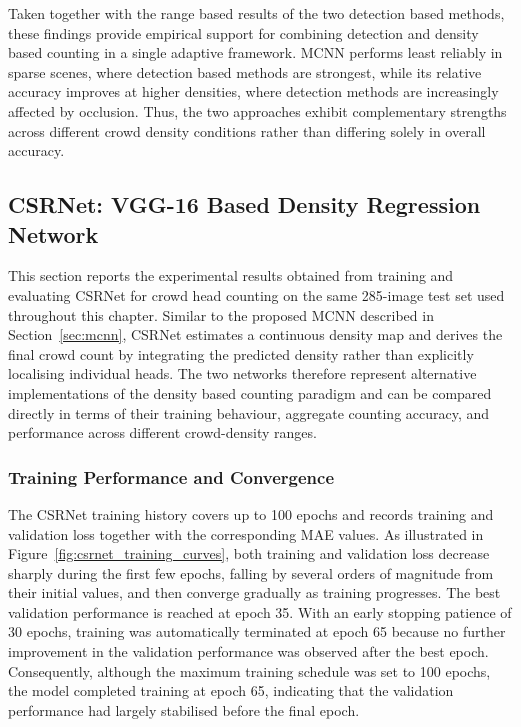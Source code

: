 Taken together with the range based results of the two detection based methods, these findings provide empirical support for combining detection and density based counting in a single adaptive framework. MCNN performs least reliably in sparse scenes, where detection based methods are strongest, while its relative accuracy improves at higher densities, where detection methods are increasingly affected by occlusion. Thus, the two approaches exhibit complementary strengths across different crowd density conditions rather than differing solely in overall accuracy.

\subsection{CSRNet: VGG-16 Based Density Regression Network}
\label{sec:csrnet}

This section reports the experimental results obtained from training and evaluating CSRNet for crowd head counting on the same 285-image test set used throughout this chapter. Similar to the proposed MCNN described in Section~\ref{sec:mcnn}, CSRNet estimates a continuous density map and derives the final crowd count by integrating the predicted density rather than explicitly localising individual heads. The two networks therefore represent alternative implementations of the density based counting paradigm and can be compared directly in terms of their training behaviour, aggregate counting accuracy, and performance across different crowd-density ranges.

\subsubsection{Training Performance and Convergence}

The CSRNet training history covers up to 100 epochs and records training and validation loss together with the corresponding MAE values. As illustrated in Figure~\ref{fig:csrnet_training_curves}, both training and validation loss decrease sharply during the first few epochs, falling by several orders of magnitude from their initial values, and then converge gradually as training progresses. The best validation performance is reached at epoch 35. With an early stopping patience of 30 epochs, training was automatically terminated at epoch 65 because no further improvement in the validation performance was observed after the best epoch. Consequently, although the maximum training schedule was set to 100 epochs, the model completed training at epoch 65, indicating that the validation performance had largely stabilised before the final epoch.

